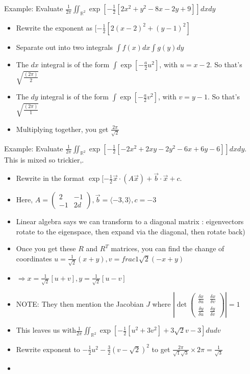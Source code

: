 \documentclass[11pt, oneside]{article}   	%
\begin{document}
Example: Evaluate $\frac{1}{2\pi} \iint_{\mathbb{R}^2} \exp [-\frac{1}{2}[2x^2 + y^2 - 8x - 2y + 9]]dx dy$
\begin{itemize}
\item Rewrite the exponent as  $[-\frac{1}{2}[2(x-2)^2 + (y-1)^2]$
\item Separate out into two integrals $\int f(x) dx \int g(y) dy$
\item The $dx$ integral is of the form $\int \exp[-\frac{a}{2}u^2]$, with $u = x-2$.  So that's $\sqrt{\frac{(2\pi)}{2}}$
\item The $dy$ integral is of the form $\int \exp[-\frac{a}{2}v^2]$, with $v = y-1$.  So that's $\sqrt{\frac{(2\pi)}{1}}$
\item Multiplying together, you get $\frac{2\pi}{\sqrt{2}}$
\end{itemize}

Example: Evaluate $\frac{1}{2\pi} \iint_{\mathbb{R}^2} \exp [-\frac{1}{2}[-2x^2 + 2xy -2y^2 - 6x +6y -6]]dx dy$.  This is mixed so trickier,.
\begin{itemize}
\item Rewrite in the format $\exp[-\frac{1}{2} \vec{x}\cdot(A\vec{x}) + \vec{b}\cdot \vec{x} + c$.  
\item Here, $A = \begin{pmatrix} 2 & -1 \\ -1 & 2 d \end{pmatrix}, \vec{b} = \langle -3, 3 \rangle, c = -3$
\item Linear algebra says we can transform to a diagonal matrix : eigenvectors rotate to the eigenspace, then expand via the diagonal, then rotate back) 
\item Once you get these $R$ and $R^T$ matrices, you can find the change of coordinates $u = \frac{1}{\sqrt{2}}(x+y), v =frac{1}{\sqrt{2}}(-x+y) $
\item $\Rightarrow x = \frac{1}{\sqrt{2}}[u+v], y = \frac{1}{\sqrt{2}}[u-v]$
\item NOTE: They then mention the Jacobian $J$ where $|  \det\begin{pmatrix} \frac{\delta x}{\delta u} & \frac{\delta x}{\delta v} \\ \frac{\delta y}{\delta u} & \frac{\delta y}{\delta v}  \end{pmatrix}  | = 1$
\item This leaves us with$\frac{1}{2\pi} \iint_{\mathbb{R}^2} \exp [-\frac{1}{2}[u^2 + 3v^2] + 3\sqrt{2}v - 3]dudv$
\item Rewrite exponent to $-\frac{1}{2}u^2 -\frac{3}{2} (v-\sqrt{2})^2$ to get $\frac{2\pi}{\sqrt{1}\sqrt{3}} \times 2\pi = \frac{1}{\sqrt{3}}$

\item \end{itemize}
\end{document}
